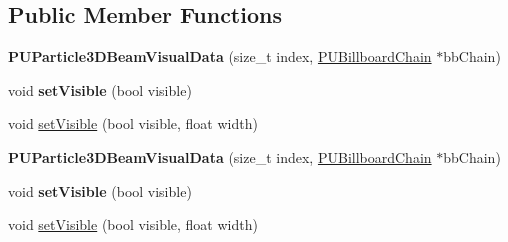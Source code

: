 \subsection*{Public Member Functions}
\begin{DoxyCompactItemize}
\item 
\mbox{\label{classPUParticle3DBeamVisualData_a0c3e6b14fe7c1eb4d1e19fe753013897}} 
{\bfseries P\+U\+Particle3\+D\+Beam\+Visual\+Data} (size\+\_\+t index, \hyperlink{classPUBillboardChain}{P\+U\+Billboard\+Chain} $\ast$bb\+Chain)
\item 
\mbox{\label{classPUParticle3DBeamVisualData_a04841f1dabda8e11cb414f54d7cf9368}} 
void {\bfseries set\+Visible} (bool visible)
\item 
void \hyperlink{classPUParticle3DBeamVisualData_ac26dcb281e318cd880865290b373f88c}{set\+Visible} (bool visible, float width)
\item 
\mbox{\label{classPUParticle3DBeamVisualData_a0c3e6b14fe7c1eb4d1e19fe753013897}} 
{\bfseries P\+U\+Particle3\+D\+Beam\+Visual\+Data} (size\+\_\+t index, \hyperlink{classPUBillboardChain}{P\+U\+Billboard\+Chain} $\ast$bb\+Chain)
\item 
\mbox{\label{classPUParticle3DBeamVisualData_a04841f1dabda8e11cb414f54d7cf9368}} 
void {\bfseries set\+Visible} (bool visible)
\item 
void \hyperlink{classPUParticle3DBeamVisualData_ac26dcb281e318cd880865290b373f88c}{set\+Visible} (bool visible, float width)
\end{DoxyCompactItemize}
